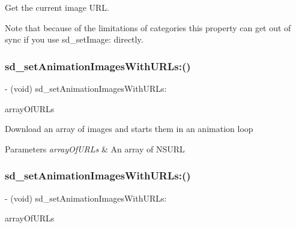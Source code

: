 Get the current image U\+RL.

Note that because of the limitations of categories this property can get out of sync if you use sd\+\_\+set\+Image\+: directly. \mbox{\label{category_u_i_image_view_07_web_cache_08_a3d9c6bf83abb348e4130429f2087b8af}} 
\subsubsection{\texorpdfstring{sd\+\_\+set\+Animation\+Images\+With\+U\+R\+Ls\+:()}{sd\_setAnimationImagesWithURLs:()}\hspace{0.1cm}{\footnotesize\ttfamily [1/3]}}
{\footnotesize\ttfamily -\/ (void) sd\+\_\+set\+Animation\+Images\+With\+U\+R\+Ls\+: \begin{DoxyParamCaption}\item[{(N\+S\+Array $\ast$)}]{array\+Of\+U\+R\+Ls }\end{DoxyParamCaption}}

Download an array of images and starts them in an animation loop


\begin{DoxyParams}{Parameters}
{\em array\+Of\+U\+R\+Ls} & An array of N\+S\+U\+RL \\
\hline
\end{DoxyParams}
\mbox{\label{category_u_i_image_view_07_web_cache_08_a3d9c6bf83abb348e4130429f2087b8af}} 
\subsubsection{\texorpdfstring{sd\+\_\+set\+Animation\+Images\+With\+U\+R\+Ls\+:()}{sd\_setAnimationImagesWithURLs:()}\hspace{0.1cm}{\footnotesize\ttfamily [2/3]}}
{\footnotesize\ttfamily -\/ (void) sd\+\_\+set\+Animation\+Images\+With\+U\+R\+Ls\+: \begin{DoxyParamCaption}\item[{(N\+S\+Array $\ast$)}]{array\+Of\+U\+R\+Ls }\end{DoxyParamCaption}}

